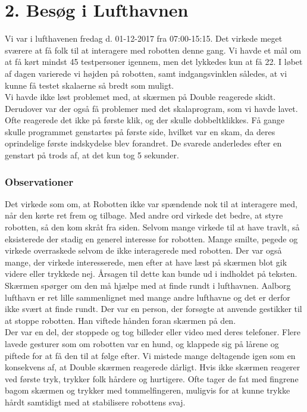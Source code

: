 \section{2. Besøg i Lufthavnen}
\label{TestAfSkalaLufthavnsBesog}
%
Vi var i lufthavenen fredag d. 01-12-2017 fra 07:00-15:15. Det virkede meget sværere at få folk til at interagere med robotten denne gang. Vi havde et mål om at få kørt mindst 45 testpersoner igennem, men det lykkedes kun at få 22. I løbet af dagen varierede vi højden på robotten, samt indgangsvinklen således, at vi kunne få testet skalaerne så bredt som muligt.\\
Vi havde ikke løst problemet med, at skærmen på Double reagerede skidt. Derudover var der også få problemer med det skalaprogram, som vi havde lavet. Ofte reagerede det ikke på første klik, og der skulle dobbeltklikkes. Få gange skulle programmet genstartes på første side, hvilket var en skam, da deres oprindelige første indskydelse blev forandret. De svarede anderledes efter en genstart på trods af, at det kun tog 5 sekunder.



\subsubsection{Observationer}
Det virkede som om, at Robotten ikke var spændende nok til at interagere med, når den kørte ret frem og tilbage. Med andre ord virkede det bedre, at styre robotten, så den kom skråt fra siden.
Selvom mange virkede til at have travlt, så eksisterede der stadig en generel interesse for robotten. Mange smilte, pegede og virkede overraskede selvom de ikke interagerede med robotten. Der var også mange, der virkede interesserede, men efter at have læst på skærmen blot gik videre eller trykkede nej. Årsagen til dette kan bunde ud i indholdet på teksten. Skærmen spørger om den må hjælpe med at finde rundt i lufthavnen. Aalborg lufthavn er ret lille sammenlignet med mange andre lufthavne og det er derfor ikke svært at finde rundt. Der var en person, der forsøgte at anvende gestikker til at stoppe robotten. Han viftede hånden foran skærmen på den.\\
Der var en del, der stoppede og tog billeder eller video med deres telefoner. Flere lavede gesturer som om robotten var en hund, og klappede sig på lårene og piftede for at få den til at følge efter. Vi mistede mange deltagende igen som en konsekvens af, at Double skærmen reagerede dårligt. Hvis ikke skærmen reagerer ved første tryk, trykker folk hårdere og hurtigere. Ofte tager de fat med fingrene bagom skærmen og trykker med tommelfingeren, muligvis for at kunne trykke hårdt samtidigt med at stabilisere robottens svaj.

